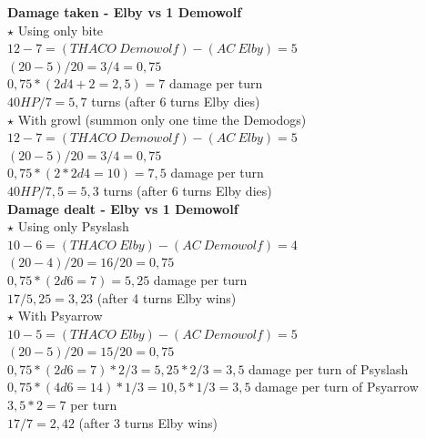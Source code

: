 \textbf{Damage taken - Elby vs 1 Demowolf}\\
\newline
$\star$ Using only bite\\
$12-7 = (THACO\:Demowolf) - (AC\:Elby) = 5$\\
$(20-5)/20 = 3/4 = 0,75$\\
$0,75 * (2d4+2 = 2,5) = 7$ damage per turn\\
$40 HP / 7 = 5,7$ turns (after 6 turns Elby dies)\\
\newline
$\star$ With growl (summon only one time the Demodogs)\\
$12-7 = (THACO\:Demowolf) - (AC\:Elby) = 5$\\
$(20-5)/20 = 3/4 = 0,75$\\
$0,75 * (2*2d4 =10) = 7,5$ damage per turn\\
$40 HP / 7,5 = 5,3$ turns (after 6 turns Elby dies)\\


\textbf{Damage dealt - Elby vs 1 Demowolf}\\
\newline
$\star$ Using only Psyslash\\
$10-6 = (THACO\:Elby) - (AC\:Demowolf) = 4$\\
$(20-4)/20 = 16/20 = 0,75$\\
$0,75 * (2d6 = 7) = 5,25$ damage per turn\\
$17 / 5,25 = 3,23$ (after 4 turns Elby wins)\\
\newline
$\star$ With Psyarrow\\
$10-5 = (THACO\:Elby) - (AC\:Demowolf) = 5$\\
$(20-5)/20 = 15/20 = 0,75$\\
$0,75 * (2d6 = 7) * 2/3  = 5,25 * 2/3 = 3,5$ damage per turn of Psyslash\\
$0,75 * (4d6 = 14) * 1/3 = 10,5 * 1/3 = 3,5$ damage per turn of Psyarrow\\
$3,5 * 2= 7$ per turn\\
$17 / 7 = 2,42$ (after 3 turns Elby wins)\\
\newpage




